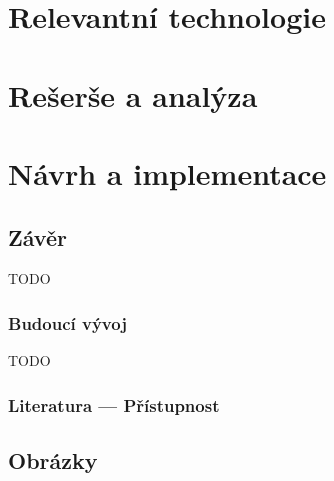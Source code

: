 \documentclass{ctuthesis}
\begin{document}
\maketitle



\part{Relevantní technologie}




\part{Rešerše a analýza}




\part{Návrh a implementace}





\chapter{Závěr}

TODO

\section{Budoucí vývoj}

TODO

\appendix

\printbibliography[title={Seznam literatury}]

\section{Literatura --- Přístupnost}

\printbibliography[keyword={a11y},heading=none]

\chapter{Obrázky}


\end{document}
